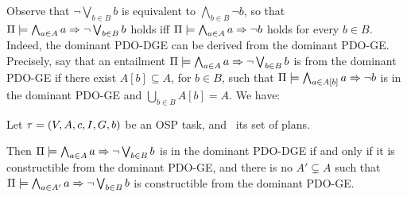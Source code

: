 Observe that $\neg \bigvee_{b \in B} b$ is equivalent to $\bigwedge_{b
  \in B} \neg b$, so that $\Pi \models \bigwedge_{a \in A}
  a \Rightarrow \neg \bigvee_{b \in B} b$ holds iff
$\Pi \models \bigwedge_{a \in A} a \Rightarrow \neg b$ holds for every $b
\in B$. Indeed, the dominant PDO-DGE can be derived from the dominant
PDO-GE. Precisely, say that an entailment
$\Pi \models \bigwedge_{a \in A} a \Rightarrow \neg \bigvee_{b \in B} b$ is
 from the dominant PDO-GE if there exist $A[b]
\subseteq A$, for $b \in B$, such that $\Pi \models \bigwedge_{a
    \in A[b]} a \Rightarrow \neg b$ is in the dominant PDO-GE and $\bigcup_{b
  \in B} A[b] = A$. We have:

\begin{proposition}\label{pro:pdodge-from-pdoge}
Let $\tau =
(V,\allowbreak A,\allowbreak{\ensuremath{c}},\allowbreak I,\allowbreak G,\allowbreak{\ensuremath{b}})$
be an OSP task, and \plans\ its set of plans.  

Then $\Pi \models \bigwedge_{a \in A} a \Rightarrow \neg \bigvee_{b \in B}
  b$ is in the dominant PDO-DGE if and only if it is constructible
from the dominant PDO-GE, and there is no $A' \subsetneq A$ such that
$\Pi \models \bigwedge_{a \in A'} a \Rightarrow \neg \bigvee_{b \in B} b$
is constructible from the dominant PDO-GE.
\end{proposition}

